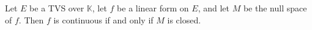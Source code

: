 Let $E$ be a TVS over $\mathbb{K}$, let $f$ be a linear form on $E$, and let $M$ be the null space of $f$. Then $f$ is continuous if and only if $M$ is closed.
